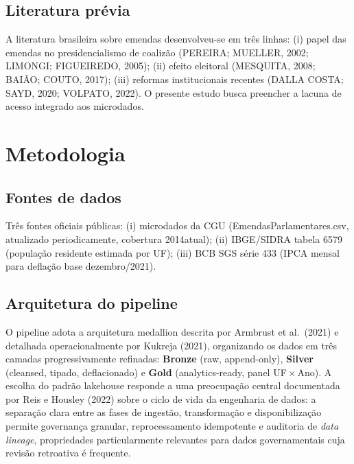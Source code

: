 \documentclass[12pt,a4paper,oneside]{article}
\begin{document}
\subsection{Literatura prévia}

A literatura brasileira sobre emendas desenvolveu-se em três linhas:
(i) papel das emendas no presidencialismo de coalizão (PEREIRA;
MUELLER, 2002; LIMONGI; FIGUEIREDO, 2005); (ii) efeito eleitoral
(MESQUITA, 2008; BAIÃO; COUTO, 2017); (iii) reformas institucionais
recentes (DALLA COSTA; SAYD, 2020; VOLPATO, 2022). O presente
estudo busca preencher a lacuna de acesso integrado aos microdados.

\section{Metodologia}\label{sec:metodo}

\subsection{Fontes de dados}

Três fontes oficiais públicas: (i) microdados da CGU
(EmendasParlamentares.csv, atualizado periodicamente, cobertura
2014\textendash atual); (ii) IBGE/SIDRA tabela 6579 (população
residente estimada por UF); (iii) BCB SGS série 433 (IPCA mensal
para deflação base dezembro/2021).

\subsection{Arquitetura do pipeline}

O pipeline adota a arquitetura medallion descrita por Armbrust et
al.\ (2021) e detalhada operacionalmente por Kukreja (2021),
organizando os dados em três camadas progressivamente refinadas:
\textbf{Bronze} (raw, append-only), \textbf{Silver} (cleansed, tipado,
deflacionado) e \textbf{Gold} (analytics-ready, panel
UF\,$\times$\,Ano). A escolha do padrão lakehouse responde a uma
preocupação central documentada por Reis e Housley (2022) sobre o
ciclo de vida da engenharia de dados: a separação clara entre as
fases de ingestão, transformação e disponibilização permite governança
granular, reprocessamento idempotente e auditoria de \textit{data
lineage}, propriedades particularmente relevantes para dados
governamentais cuja revisão retroativa é frequente.
\end{document}
